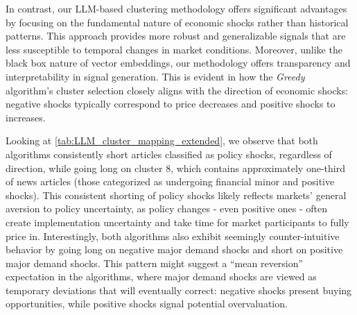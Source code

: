 %
%

In contrast, our LLM-based clustering methodology offers significant advantages by focusing on the fundamental nature of economic shocks rather than historical patterns. This approach provides more robust and generalizable signals that are less susceptible to temporal changes in market conditions. Moreover, unlike the black box nature of vector embeddings, our methodology offers transparency and interpretability in signal generation. This is evident in how the \textit{Greedy} algorithm's cluster selection closely aligns with the direction of economic shocks: negative shocks typically correspond to price decreases and positive shocks to increases. 

Looking at \cref{tab:LLM_cluster_mapping_extended}, we observe that both algorithms consistently short articles classified as policy shocks, regardless of direction, while going long on cluster 8, which contains approximately one-third of news articles (those categorized as undergoing financial minor and positive shocks). This consistent shorting of policy shocks likely reflects markets' general aversion to policy uncertainty, as policy changes - even positive ones - often create implementation uncertainty and take time for market participants to fully price in. Interestingly, both algorithms also exhibit seemingly counter-intuitive behavior by going long on negative major demand shocks and short on positive major demand shocks. This pattern might suggest a ``mean reversion'' expectation in the algorithms, where major demand shocks are viewed as temporary deviations that will eventually correct: negative shocks present buying opportunities, while positive shocks signal potential overvaluation.

